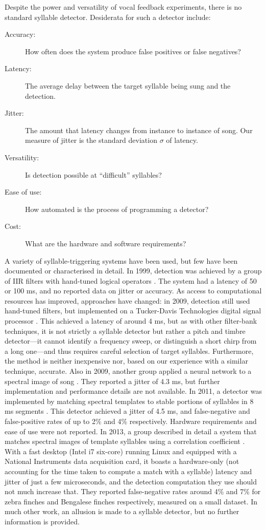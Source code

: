 \documentclass[10pt,letterpaper]{article}
\begin{document}
Despite the power and versatility of vocal feedback experiments, there
is no standard syllable detector.  Desiderata for such a detector include:
\begin{description}
\item[Accuracy:] How often does the system produce false positives or false negatives?
\item[Latency:] The average delay between the target syllable being sung and the detection.
\item[Jitter:] The amount that latency changes from instance to instance of song.  Our measure of jitter is the standard deviation $\sigma$ of latency.
\item[Versatility:] Is detection possible at ``difficult'' syllables?
\item[Ease of use:] How automated is the process of programming a detector?
\item[Cost:] What are the hardware and software requirements?
\end{description}

A variety of syllable-triggering systems have been used, but few have
been documented or characterised in detail.  In 1999,
detection was achieved by a group of IIR filters with hand-tuned logical
operators \cite{Leonardo1999}.  The system had a latency of 50 or 100 ms,
and no reported data on jitter or accuracy.  As access to
computational resources has improved, approaches have changed: in
2009, detection still used hand-tuned filters, but implemented
on a Tucker-Davis Technologies digital signal processor \cite{Andalman2009}.  This
achieved a latency of around 4 ms, but as with other filter-bank techniques, it
is not strictly a syllable detector but rather a pitch and timbre
detector---it cannot identify a frequency sweep, or distinguish a
short chirp from a long one---and thus requires careful selection of
target syllables.  Furthermore, the method is neither inexpensive nor,
based on our experience with a similar technique, accurate.
Also in 2009, another group applied a neural network to a spectral image of
song \cite{Keller2009}.  They reported a jitter of 4.3 ms, but further implementation and
performance details are not available.  In 2011, a detector was implemented by
matching spectral templates to stable portions of syllables in 8 ms
segments \cite{Warren2011}.  This detector achieved a jitter of 4.5 ms, and false-negative and
false-positive rates of up to 2\% and 4\% respectively.  Hardware
requirements and ease of use were not reported.  In 2013,
a group described in detail a system that matches spectral
images of template syllables using a correlation coefficient \cite{Skocik2013}.  With a
fast desktop (Intel i7 six-core) running Linux and equipped with a
National Instruments data acquisition card, it boasts a hardware-only
(not accounting for the time taken to compute a match with a syllable)
latency and jitter of just a few microseconds, and the detection
computation they use should not much increase that.  They reported
false-negative rates around 4\% and 7\% for zebra finches and
Bengalese finches respectively, measured on a small dataset.  In much
other work, an allusion is made to a syllable detector, but no further
information is provided.
\end{document}
